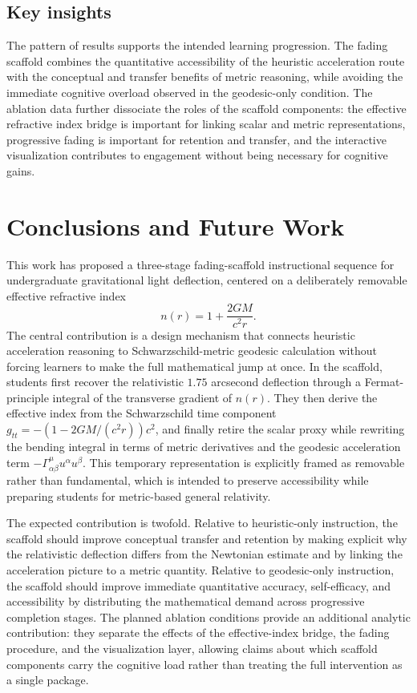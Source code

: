 \documentclass{article}
\begin{document}
\subsection*{Key insights}

The pattern of results supports the intended learning progression. The fading scaffold combines the quantitative accessibility of the heuristic acceleration route with the conceptual and transfer benefits of metric reasoning, while avoiding the immediate cognitive overload observed in the geodesic-only condition. The ablation data further dissociate the roles of the scaffold components: the effective refractive index bridge is important for linking scalar and metric representations, progressive fading is important for retention and transfer, and the interactive visualization contributes to engagement without being necessary for cognitive gains.

\section{Conclusions and Future Work}

This work has proposed a three-stage fading-scaffold instructional sequence for undergraduate gravitational light deflection, centered on a deliberately removable effective refractive index
\begin{equation}
n(r)=1+\frac{2GM}{c^{2}r}.
\end{equation}
The central contribution is a design mechanism that connects heuristic acceleration reasoning to Schwarzschild-metric geodesic calculation without forcing learners to make the full mathematical jump at once. In the scaffold, students first recover the relativistic \(1.75\) arcsecond deflection through a Fermat-principle integral of the transverse gradient of \(n(r)\). They then derive the effective index from the Schwarzschild time component \(g_{tt}=-(1-2GM/(c^{2}r))c^{2}\), and finally retire the scalar proxy while rewriting the bending integral in terms of metric derivatives and the geodesic acceleration term \(-\Gamma^{\mu}_{\alpha\beta}u^{\alpha}u^{\beta}\). This temporary representation is explicitly framed as removable rather than fundamental, which is intended to preserve accessibility while preparing students for metric-based general relativity.

The expected contribution is twofold. Relative to heuristic-only instruction, the scaffold should improve conceptual transfer and retention by making explicit why the relativistic deflection differs from the Newtonian estimate and by linking the acceleration picture to a metric quantity. Relative to geodesic-only instruction, the scaffold should improve immediate quantitative accuracy, self-efficacy, and accessibility by distributing the mathematical demand across progressive completion stages. The planned ablation conditions provide an additional analytic contribution: they separate the effects of the effective-index bridge, the fading procedure, and the visualization layer, allowing claims about which scaffold components carry the cognitive load rather than treating the full intervention as a single package.
\end{document}
